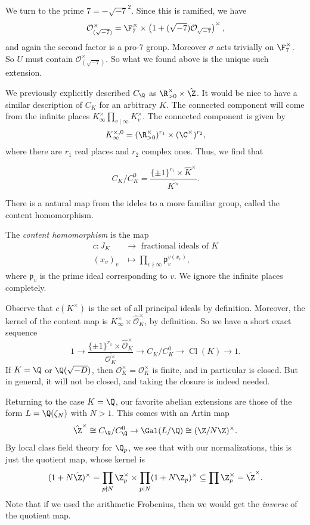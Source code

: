 \documentclass[a4paper]{article}
\DeclareMathOperator\Cl{\mathrm{Cl}}
\begin{document}
\begin{eg}
  We turn to the prime $7 = -\sqrt{-7}^2$. Since this is ramified, we have
  \[
    \mathcal{O}_{(\sqrt{-7})}^\times = \F_7^\times \times \left(1 + (\sqrt{-7}) \mathcal{O}_{\sqrt{-7}}\right)^{\times},
  \]
  and again the second factor is a pro-$7$ group. Moreover $\sigma$ acts trivially on $\F_7^\times$. So $U$ must contain $\mathcal{O}_{(\sqrt{-7})}^\times$. So what we found above is the unique such extension.
\end{eg}

We previously explicitly described $C_\Q$ as $\R_{>0}^\times \times \hat{\Z}$. It would be nice to have a similar description of $C_K$ for an arbitrary $K$. The connected component will come from the infinite places $K_\infty^\times \prod_{v \mid \infty} K_v^\times$. The connected component is given by
\[
  K_\infty^{\times, 0} = (\R^\times_{> 0})^{r_1} \times (\C^\times)^{r_2},
\]
where there are $r_1$ real places and $r_2$ complex ones. Thus, we find that
\begin{prop}
  \[
    C_K/C_K^0 = \frac{\{\pm 1\}^{r_1} \times \hat{K}^\times}{\overline{K^\times}}.
  \]
\end{prop}

There is a natural map from the ideles to a more familiar group, called the content homomorphism.
\begin{defi}
  The \emph{content homomorphism} is the map
  \begin{align*}
    c: J_K&\to \text{ fractional ideals of }K\\
    (x_v)_v &\mapsto \prod_{v \nmid \infty}\mathfrak{p}_v^{v(x_v)},
  \end{align*}
  where $\mathfrak{p}_v$ is the prime ideal corresponding to $v$. We ignore the infinite places completely.
\end{defi}
Observe that $c(K^\times)$ is the set of all principal ideals by definition. Moreover, the kernel of the content map is $K_\infty^\times \times \hat{\mathcal{O}}_K^\times$, by definition. So we have a short exact sequence
\[
  1 \to \frac{\{\pm 1\}^{r_1} \times \hat{\mathcal{O}}_K^\times}{\overline{\mathcal{O}_K^\times}} \to C_K /C_K^0 \to \Cl(K) \to 1.
\]
If $K = \Q $ or $\Q(\sqrt{-D})$, then $\overline{\mathcal{O}_K^\times} = \mathcal{O}_K^\times$ is finite, and in particular is closed. But in general, it will not be closed, and taking the closure is indeed needed.

Returning to the case $K = \Q$, our favorite abelian extensions are those of the form $L = \Q(\zeta_N)$ with $N > 1$. This comes with an Artin map
\[
  \hat{\Z}^\times \cong C_\Q/C_\Q^0 \to \Gal(L/\Q) \cong (\Z/N\Z)^\times.
\]
By local class field theory for $\Q_p$, we see that with our normalizations, this is just the quotient map, whose kernel is
\[
  (1 + N \hat{\Z})^\times = \prod_{p \nmid N}\Z_p^\times \times \prod_{p \mid N} (1 + N \Z_p)^\times \subseteq \prod \Z_p^\times = \hat{\Z}^\times.
\]
Note that if we used the arithmetic Frobenius, then we would get the \emph{inverse} of the quotient map.
\end{document}
